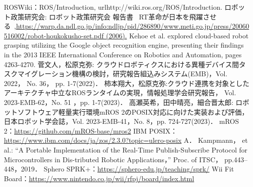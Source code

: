 \documentclass[11pt]{ujarticle}
\begin{document}
\begin{thebibliography}{99}
	ROSWiki：ROS/Introduction, url{http://wiki.ros.org/ROS/Introduction.}
	ロボット政策研究会: ロボット政策研究会 報告書 ~RT革命が日本を飛躍させる~,\url{https://warp.da.ndl.go.jp/info:ndljp/pid/286890/www.meti.go.jp/press/20060516002/robot-houkokusho-set.pdf (2006).}
	Kehoe et al. explored cloud-based robot grasping utilizing the Google object recognition engine, presenting their findings in the 2013 IEEE International Conference on Robotics and Automation, pages 4263-4270.
	菅文人，松原克弥: クラウドロボティクスにおける異種デバイス間タスクマイグレーション機構の検討，研究報告組込みシステム(EMB)，Vol. 2022， No. 36， pp. 1-7(2022)．
	柿本翔大，松原克弥:クラウド連携を対象としたアーキテクチャ中立なROSランタイムの実現，情報処理学会研究報告， Vol. 2023-EMB-62，No. 51 ，pp. 1-7(2023)．
	高瀬英希，田中晴亮，細合晋太郎: ロボットソフトウェア軽量実行環境mROS 2のPOSIX対応に向けた実装および評価，日本ロボット学会誌，Vol. 2023-EMB-41，No. 8，pp. 724-727(2023)．
	mROS 2：\url{https://github.com/mROS-base/mros2}
	IBM POSIX：\url{https://www.ibm.com/docs/ja/zos/2.3.0?topic=ulero-posix}
	A． Kampmann， et al.: “A Portable Implementation of the Real-Time Publish-Subscribe Protocol for Microcontrollers in Dis-tributed Robotic Applications，” Proc. of ITSC， pp.443–448，2019．
	Sphero SPRK+：\url{https://sphero-edu.jp/teaching/sprk/}
	Wii Fit Board：\url{https://www.nintendo.co.jp/wii/rfpj/board/index.html}
\end{thebibliography}
\end{document}
